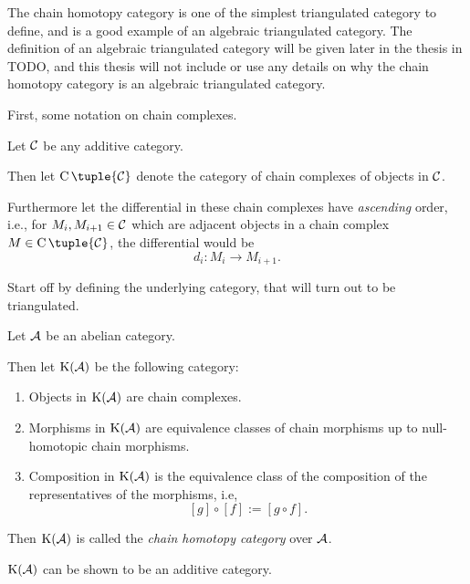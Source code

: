 The chain homotopy category is one of the simplest triangulated category to define, and is a good example of an algebraic triangulated category. The definition of an algebraic triangulated category will be given later in the thesis in TODO, and this thesis will not include or use any details on why the chain homotopy category is an algebraic triangulated category.

First, some notation on chain complexes.

\begin{notation}
    \label{not:chain_complex}
    Let \( {\mathcal{C}} \) be any additive category.
    
    Then let \( \C \tuple{\Cc} \) denote the category of chain complexes of objects in \( {\mathcal{C}} \).

    Furthermore let the differential in these chain complexes have \emph{ascending} order, i.e., for \( M_i, M_{i+1} \in {\mathcal{C}} \) which are adjacent objects in a chain complex \( M \in \C \tuple{\Cc} \), the differential would be
    \[
        d_i : M_i \to M_{i + 1}.
    \]
\end{notation}

Start off by defining the underlying category, that will turn out to be triangulated.

\begin{definition}
    \label{def:chain_homotopy_cat}
    Let \( {\mathcal{A}} \) be an abelian category.

    Then let \( \operatorname{K}({\mathcal{A}}) \) be the following category:
    \begin{enumerate}
        \item {
            Objects in \( \operatorname{K}({\mathcal{A}}) \) are chain complexes.
        }
        \item {
            Morphisms in \( \operatorname{K}({\mathcal{A}}) \) are equivalence classes of chain morphisms up to null-homotopic chain morphisms.
        }
        \item {
            Composition in \( \operatorname{K}({\mathcal{A}}) \) is the equivalence class of the composition of the representatives of the morphisms, i.e,
            \[
                [g] \circ [f] := [g \circ f ].
            \]
        }
    \end{enumerate}

    Then \( \operatorname{K}({\mathcal{A}}) \) is called the \emph{chain homotopy category} over \( {\mathcal{A}} \).
\end{definition}

\( \operatorname{K}({\mathcal{A}}) \) can be shown to be an additive category.

